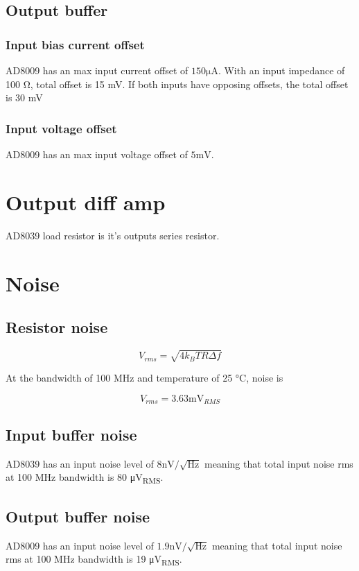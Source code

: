 \documentclass[11pt]{article}
\begin{document}
\subsection{Output buffer}
\subsubsection{Input bias current offset}
AD8009 has an max input current offset of $150 \si{\micro \ampere}$. With an input impedance of 
100 \si{\ohm}, total offset is 15 mV. If both inputs have opposing offsets, the total offset is 30 mV

\subsubsection{Input voltage offset}
AD8009 has an max input voltage offset of $5 \si{\milli \volt}$.

\section{Output diff amp}
AD8039 load resistor is it's outputs series resistor. 

\section{Noise}

\subsection{Resistor noise}


\begin{equation}
  V_{rms} = \sqrt{4 k_B T R \Delta f}
\end{equation}

At the bandwidth of 100 \si{\mega \hertz} and temperature of 25 \si{\celsius}, noise is

\begin{equation}
  V_{rms} = 3.63 \si{\milli \volt_{RMS}}
\end{equation}

\subsection{Input buffer noise}

AD8039 has an input noise level of $8 \si{\nano \volt} / \sqrt{\si{\hertz}}$ meaning 
that total input noise rms at 100 \si{\mega \hertz} bandwidth is 80 \si{\micro \volt_{RMS}}.

\subsection{Output buffer noise}
AD8009 has an input noise level of $1.9 \si{\nano \volt} / \sqrt{\si{\hertz}}$ meaning 
that total input noise rms at 100 \si{\mega \hertz} bandwidth is 19 \si{\micro \volt_{RMS}}.
\end{document}
